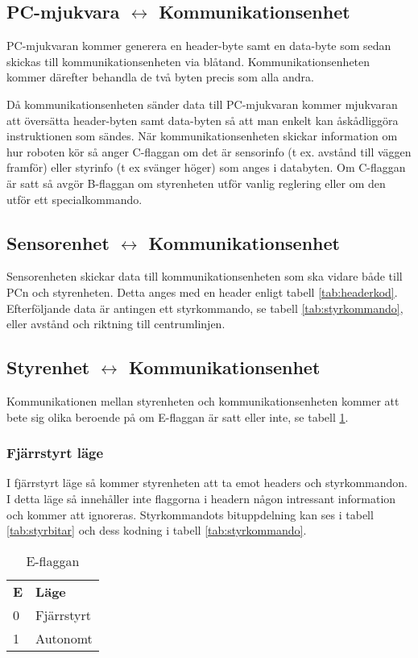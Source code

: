 \subsection{PC-mjukvara $\longleftrightarrow$ Kommunikationsenhet}
PC-mjukvaran kommer generera en header-byte samt en data-byte som sedan skickas
till kommunikationsenheten via blåtand. Kommunikationsenheten kommer därefter
behandla de två byten precis som alla andra.

Då kommunikationsenheten sänder data till PC-mjukvaran kommer mjukvaran att
översätta header-byten samt data-byten så att man enkelt kan åskådliggöra
instruktionen som sändes. När kommunikationsenheten skickar information om hur roboten kör
så anger C-flaggan om det är sensorinfo (t ex. avstånd till väggen framför) eller styrinfo (t ex svänger höger)
som anges i databyten. Om C-flaggan är satt så avgör B-flaggan om styrenheten utför vanlig reglering eller om
den utför ett specialkommando.

\subsection{Sensorenhet $\longleftrightarrow$ Kommunikationsenhet}
Sensorenheten skickar data till kommunikationsenheten som ska vidare både till PCn och styrenheten. Detta anges med en header enligt tabell \ref{tab:headerkod}. Efterföljande data är antingen ett styrkommando, se tabell \ref{tab:styrkommando}, eller avstånd och riktning till centrumlinjen.

\subsection{Styrenhet $\longleftrightarrow$ Kommunikationsenhet}
Kommunikationen mellan styrenheten och kommunikationsenheten kommer att bete sig olika beroende på om E-flaggan
är satt eller inte, se tabell \ref{tab:eflagga}.

\subsubsection{Fjärrstyrt läge}
I fjärrstyrt läge så kommer styrenheten att ta emot headers och styrkommandon. I detta läge så 
innehåller inte flaggorna i headern någon intressant information och kommer att ignoreras. Styrkommandots bituppdelning kan ses i 
tabell \ref{tab:styrbitar} och dess kodning i tabell \ref{tab:styrkommando}.

\begin{table}[h]
  \centering
  \begin{tabular}{l l}
    \textbf{E} & \textbf{Läge} \\
    0 & Fjärrstyrt \\
    1 & Autonomt \\
  \end{tabular}
  \caption{E-flaggan}
  \label{tab:eflagga}
\end{table}
 
